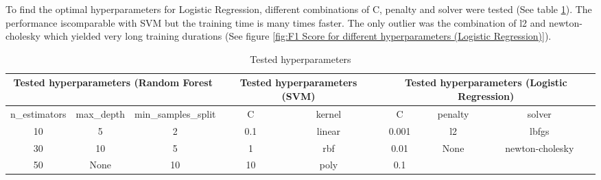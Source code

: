\begin{enumerate}[label=\roman*.)]
To find the optimal hyperparameters for Logistic Regression, different combinations of C, penalty and solver  were tested (See table \ref{tab:Tested hyperparameters}). The performance iscomparable with SVM but the training time is many times faster. The only outlier was the combination of l2 and newton-cholesky which yielded very long training durations (See figure \ref{fig:F1 Score for different hyperparameters (Logistic Regression)}).
\begin{table}[htbp]
    \centering
    \begin{tabular}{cccccccc}\toprule
         \multicolumn{3}{c}{Tested hyperparameters (Random Forest} & \multicolumn{2}{c}{Tested hyperparameters (SVM)}& \multicolumn{3}{c}{Tested hyperparameters (Logistic Regression)}\\\midrule
         n\_estimators&  max\_depth& min\_samples\_split & C& kernel
& C& penalty&solver
\\
         10&  5& 2 & 0.1& linear
& 0.001& l2&lbfgs
\\
         30&  10& 5 & 1& rbf
& 0.01& None&newton-cholesky
\\
         50&  None& 10 & 10& poly& 0.1& &
\\ \bottomrule
    \end{tabular}
    \caption{Tested hyperparameters}
    \label{tab:Tested hyperparameters}
\end{table}



\end{enumerate}
